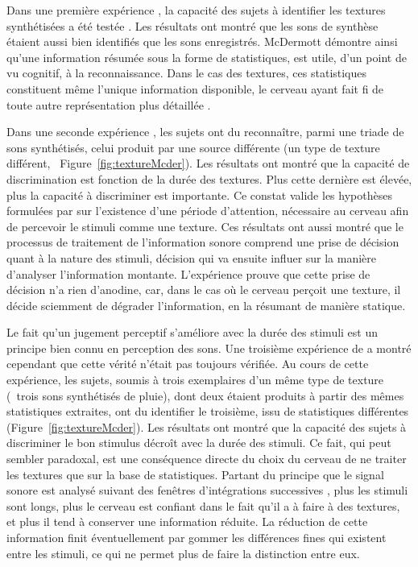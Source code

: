 Dans une première expérience \citep{mcdermott2011sound}, la capacité des sujets à identifier les textures synthétisées a été testée . Les résultats ont montré que les sons de synthèse étaient aussi bien identifiés que les sons enregistrés. McDermott démontre ainsi qu'une information résumée sous la forme de statistiques, est utile, d'un point de vu cognitif, à la reconnaissance. Dans le cas des textures, ces statistiques constituent même l'unique information disponible, le cerveau ayant fait fi de toute autre représentation plus détaillée \citep{nelken2013ear}.

Dans une seconde expérience \citep{mcdermott2013summary}, les sujets ont du reconnaître, parmi une triade de sons synthétisés, celui produit par une source différente (\ie un type de texture différent, \Cf~Figure~\ref{fig:textureMcder}). Les résultats ont montré que la capacité de discrimination est fonction de la durée des textures. Plus cette dernière est élevée, plus la capacité à discriminer est importante. Ce constat valide les hypothèses formulées par \citep{saint1995classification} sur l'existence d'une période d'attention, nécessaire au cerveau afin de percevoir le stimuli comme une texture. Ces résultats ont aussi montré que le processus de traitement de l'information sonore comprend une prise de décision quant à la nature des stimuli, décision qui va  ensuite influer sur la manière d'analyser l'information montante. L'expérience prouve que cette prise de décision n'a rien d'anodine, car, dans le cas où le cerveau perçoit une texture, il décide sciemment de dégrader l'information, en la résumant de manière statique.

Le fait qu'un jugement perceptif s'améliore avec la durée des stimuli est un principe bien connu en perception des sons\citep{moore1973frequency}. Une troisième expérience de \citep{mcdermott2013summary} a montré cependant que cette vérité n'était pas toujours vérifiée. Au cours de cette expérience, les sujets, soumis à trois exemplaires d'un même type de texture (\eg~trois sons synthétisés de pluie), dont deux étaient produits à partir des mêmes statistiques extraites, ont du identifier le troisième, issu de statistiques différentes (Figure~\ref{fig:textureMcder}). Les résultats ont montré que la capacité des sujets à discriminer le bon stimulus décroît avec la durée des stimuli. Ce fait, qui peut sembler paradoxal, est une conséquence directe du choix du cerveau de ne traiter les textures que sur la base de statistiques. Partant du principe que le signal sonore est analysé suivant des fenêtres d'intégrations successives \citep{yabe1998temporal,poeppel2003analysis}, plus les stimuli sont longs, plus le cerveau est confiant dans le fait qu'il a à faire à des textures, et plus il tend à conserver une information réduite. La réduction de cette information finit éventuellement par gommer les différences fines qui existent entre les stimuli, ce qui ne permet plus de faire la distinction entre eux.


